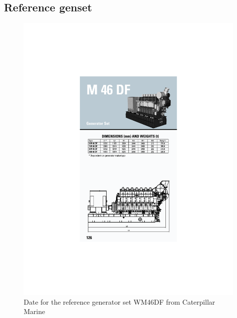 \subsection{Reference genset}\label{sec:referenceGenset}
\begin{figure}
    \centering
    \includegraphics{figures/gensetDataWM46DF.pdf}
    \caption{Date for the reference generator set WM46DF from Caterpillar Marine}
    \label{fig:gensetDataWM46DF}
\end{figure}